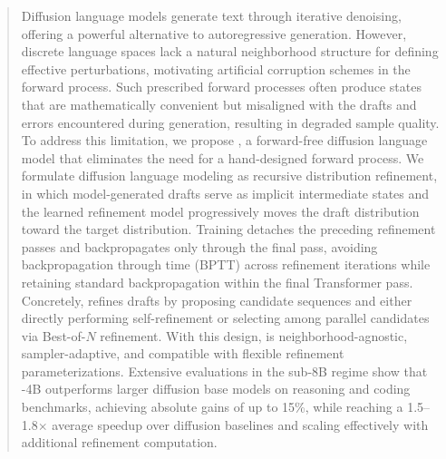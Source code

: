 \begin{abstract}
Diffusion language models generate text through iterative denoising, offering a powerful alternative to autoregressive generation.
However, discrete language spaces lack a natural neighborhood structure for defining effective perturbations, motivating artificial corruption schemes in the forward process.
Such prescribed forward processes often produce states that are mathematically convenient but misaligned with the drafts and errors encountered during generation, resulting in degraded sample quality.
To address this limitation, we propose \method, a forward-free diffusion language model that eliminates the need for a hand-designed forward process.
We formulate diffusion language modeling as recursive distribution refinement, in which model-generated drafts serve as implicit intermediate states and the learned refinement model progressively moves the draft distribution toward the target distribution.
Training detaches the preceding refinement passes and backpropagates only through the final pass, avoiding backpropagation through time (BPTT) across refinement iterations while retaining standard backpropagation within the final Transformer pass.
Concretely, \method refines drafts by proposing candidate sequences and either directly performing self-refinement or selecting among parallel candidates via Best-of-$N$ refinement.
With this design, \method is neighborhood-agnostic, sampler-adaptive, and compatible with flexible refinement parameterizations.
Extensive evaluations in the sub-8B regime show that \method-4B outperforms larger diffusion base models on reasoning and coding benchmarks, achieving absolute gains of up to 15\%, while reaching a 1.5--1.8$\times$ average speedup over diffusion baselines and scaling effectively with additional refinement computation.
\end{abstract}
